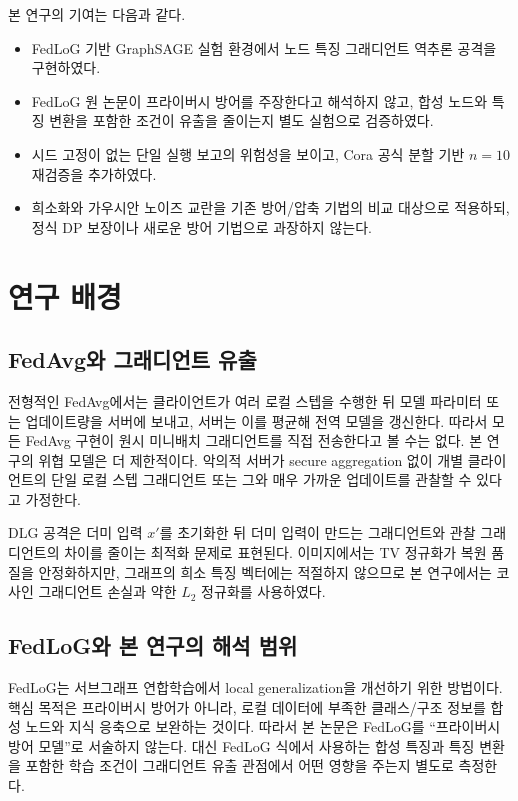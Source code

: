 \documentclass[10pt,twocolumn]{article}
\begin{document}
본 연구의 기여는 다음과 같다.
\begin{itemize}
\item FedLoG 기반 GraphSAGE 실험 환경에서 노드 특징 그래디언트 역추론 공격을 구현하였다.
\item FedLoG 원 논문이 프라이버시 방어를 주장한다고 해석하지 않고, 합성 노드와 특징 변환을 포함한 조건이 유출을 줄이는지 별도 실험으로 검증하였다.
\item 시드 고정이 없는 단일 실행 보고의 위험성을 보이고, Cora 공식 분할 기반 $n=10$ 재검증을 추가하였다.
\item 희소화와 가우시안 노이즈 교란을 기존 방어/압축 기법의 비교 대상으로 적용하되, 정식 DP 보장이나 새로운 방어 기법으로 과장하지 않는다.
\end{itemize}

\section{연구 배경}
\subsection{FedAvg와 그래디언트 유출}
전형적인 FedAvg\cite{mcmahan2017fedavg}에서는 클라이언트가 여러 로컬 스텝을 수행한 뒤 모델 파라미터 또는 업데이트량을 서버에 보내고, 서버는 이를 평균해 전역 모델을 갱신한다. 따라서 모든 FedAvg 구현이 원시 미니배치 그래디언트를 직접 전송한다고 볼 수는 없다. 본 연구의 위협 모델은 더 제한적이다. 악의적 서버가 secure aggregation 없이 개별 클라이언트의 단일 로컬 스텝 그래디언트 또는 그와 매우 가까운 업데이트를 관찰할 수 있다고 가정한다.

DLG 공격은 더미 입력 $x'$를 초기화한 뒤 더미 입력이 만드는 그래디언트와 관찰 그래디언트의 차이를 줄이는 최적화 문제로 표현된다. 이미지에서는 TV 정규화가 복원 품질을 안정화하지만, 그래프의 희소 특징 벡터에는 적절하지 않으므로 본 연구에서는 코사인 그래디언트 손실과 약한 $L_2$ 정규화를 사용하였다.

\subsection{FedLoG와 본 연구의 해석 범위}
FedLoG\cite{kim2025fedlog}는 서브그래프 연합학습에서 local generalization을 개선하기 위한 방법이다. 핵심 목적은 프라이버시 방어가 아니라, 로컬 데이터에 부족한 클래스/구조 정보를 합성 노드와 지식 응축으로 보완하는 것이다. 따라서 본 논문은 FedLoG를 ``프라이버시 방어 모델''로 서술하지 않는다. 대신 FedLoG 식에서 사용하는 합성 특징과 특징 변환을 포함한 학습 조건이 그래디언트 유출 관점에서 어떤 영향을 주는지 별도로 측정한다.
\end{document}
